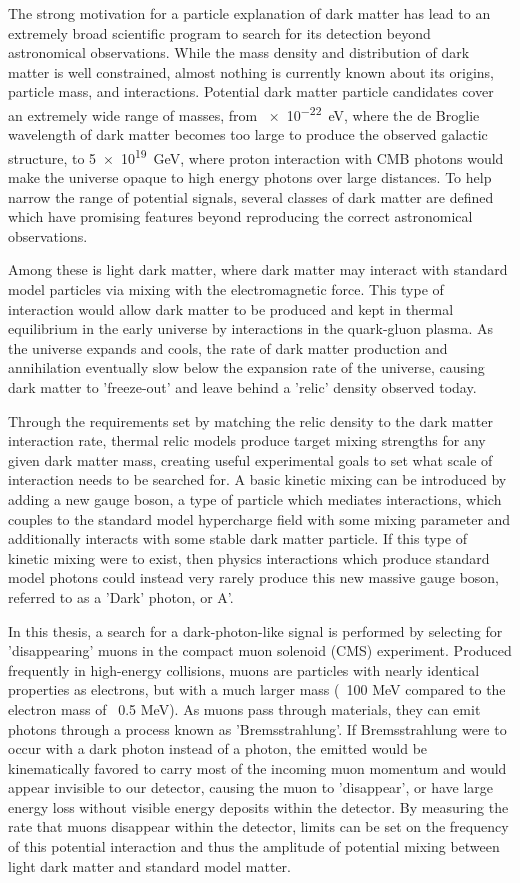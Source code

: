 The strong motivation for a particle explanation of dark matter has lead to an extremely broad scientific program to search for its detection beyond astronomical observations. 
While the mass density and distribution of dark matter is well constrained, almost nothing is currently known about its origins, particle mass, and interactions.
Potential dark matter particle candidates cover an extremely wide range of masses, from \SI{e-22}{\eV}, where the de Broglie wavelength of dark matter becomes too large to produce the observed galactic structure, to \SI{5e19}{\giga\eV}, where proton interaction with CMB photons would make the universe opaque to high energy photons over large distances.
To help narrow the range of potential signals, several classes of dark matter are defined which have promising features beyond reproducing the correct astronomical observations. 

Among these is light dark matter, where dark matter may interact with standard model particles via mixing with the electromagnetic force. 
This type of interaction would allow dark matter to be produced and kept in thermal equilibrium in the early universe by interactions in the quark-gluon plasma.
As the universe expands and cools, the rate of dark matter production and annihilation eventually slow below the expansion rate of the universe, causing dark matter to 'freeze-out' and leave behind a 'relic' density observed today.

Through the requirements set by matching the relic density to the dark matter interaction rate, thermal relic models produce target mixing strengths for any given dark matter mass, creating useful experimental goals to set what scale of interaction needs to be searched for.
A basic kinetic mixing can be introduced by adding a new gauge boson, a type of particle which mediates interactions, which couples to the standard model hypercharge field with some mixing parameter and additionally interacts with some stable dark matter particle.
If this type of kinetic mixing were to exist, then physics interactions which produce standard model photons could instead very rarely produce this new massive gauge boson, referred to as a 'Dark' photon, or A'. 

In this thesis, a search for a dark-photon-like signal is performed by selecting for 'disappearing' muons in the compact muon solenoid (CMS) experiment. 
Produced frequently in high-energy collisions, muons are particles with nearly identical properties as electrons, but with a much larger mass (~100 MeV compared to the electron mass of ~0.5 MeV).
As muons pass through materials, they can emit photons through a process known as 'Bremsstrahlung'. 
If Bremsstrahlung were to occur with a dark photon instead of a photon, the emitted \aprime would be kinematically favored to carry most of the incoming muon momentum and would appear invisible to our detector, causing the muon to 'disappear', or have large energy loss without visible energy deposits within the detector.
By measuring the rate that muons disappear within the detector, limits can be set on the frequency of this potential interaction and thus the amplitude of potential mixing between light dark matter and standard model matter.

